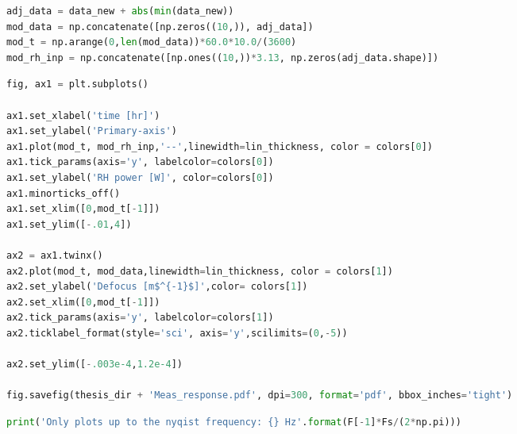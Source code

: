 %

\begin{spacing}{1.2} \begin{lstlisting}[frame=single,language=Python]
adj_data = data_new + abs(min(data_new))
mod_data = np.concatenate([np.zeros((10,)), adj_data])
mod_t = np.arange(0,len(mod_data))*60.0*10.0/(3600)
mod_rh_inp = np.concatenate([np.ones((10,))*3.13, np.zeros(adj_data.shape)])
\end{lstlisting} \end{spacing}

\begin{spacing}{1.2} \begin{lstlisting}[frame=single,language=Python]
fig, ax1 = plt.subplots() 

ax1.set_xlabel('time [hr]') 
ax1.set_ylabel('Primary-axis') 
ax1.plot(mod_t, mod_rh_inp,'--',linewidth=lin_thickness, color = colors[0]) 
ax1.tick_params(axis='y', labelcolor=colors[0])
ax1.set_ylabel('RH power [W]', color=colors[0])
ax1.minorticks_off()
ax1.set_xlim([0,mod_t[-1]])
ax1.set_ylim([-.01,4])

ax2 = ax1.twinx() 
ax2.plot(mod_t, mod_data,linewidth=lin_thickness, color = colors[1])
ax2.set_ylabel('Defocus [m$^{-1}$]',color= colors[1])
ax2.set_xlim([0,mod_t[-1]])
ax2.tick_params(axis='y', labelcolor=colors[1])
ax2.ticklabel_format(style='sci', axis='y',scilimits=(0,-5))

ax2.set_ylim([-.003e-4,1.2e-4])

fig.savefig(thesis_dir + 'Meas_response.pdf', dpi=300, format='pdf', bbox_inches='tight')
\end{lstlisting} \end{spacing}


\begin{spacing}{1.2} \begin{lstlisting}[frame=single,language=Python]
print('Only plots up to the nyqist frequency: {} Hz'.format(F[-1]*Fs/(2*np.pi)))
\end{lstlisting} \end{spacing}

